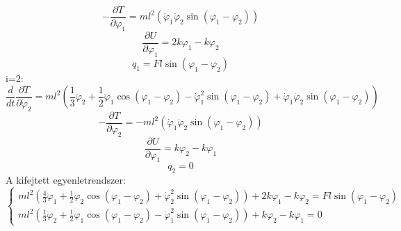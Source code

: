 \documentclass[12pt,twoside]{article}
\begin{document}
\begin{equation} \label{eq:Newton}
-\frac{\partial T}{\partial \varphi_1}=ml^2\left(\dot\varphi_1\dot\varphi_2\sin{(\varphi_1-\varphi_2)}\right)
\end{equation}
\begin{equation} \label{eq:Newton}
\frac{\partial U}{\partial \varphi_1}=2k\varphi_1-k\varphi_2
\end{equation}
\begin{equation} \label{eq:Newton}
q_1 =Fl \sin{(\varphi_1-\varphi_2)}
\end{equation}
i=2:
\begin{equation} \label{eq:Newton}
\frac{d}{dt}\frac{\partial T}{\partial \dot \varphi_2}=
ml^2\left(\frac{1}{3} \ddot \varphi_2+\frac{1}{2}\ddot \varphi_1 \cos{(\varphi_1-\varphi_2)}-\dot\varphi_1^2\sin{(\varphi_1-\varphi_2)}+\dot\varphi_1\dot\varphi_2\sin{(\varphi_1-\varphi_2)}\right)
\end{equation}
\begin{equation} \label{eq:Newton}
-\frac{\partial T}{\partial \varphi_2}=-ml^2\left(\dot\varphi_1\dot\varphi_2\sin{(\varphi_1-\varphi_2)}\right)
\end{equation}
\begin{equation} \label{eq:Newton}
\frac{\partial U}{\partial \varphi_1}=k\varphi_2-k\varphi_1
\end{equation}
\begin{equation} \label{eq:Newton}
q_2 =0
\end{equation}
A kifejtett egyenletrendszer:
\begin{equation} \label{eq:Newton}
\begin{cases}
ml^2\left(\frac{4}{3} \ddot \varphi_1+\frac{1}{2}\ddot \varphi_2 \cos{(\varphi_1-\varphi_2)}+\dot\varphi_2^2\sin{(\varphi_1-\varphi_2)}\right)+2k\varphi_1-k\varphi_2=Fl \sin{(\varphi_1-\varphi_2)}
\\ 
ml^2\left(\frac{1}{3} \ddot \varphi_2+\frac{1}{2}\ddot \varphi_1 \cos{(\varphi_1-\varphi_2)}-\dot\varphi_1^2\sin{(\varphi_1-\varphi_2)}\right)+k\varphi_2-k\varphi_1=0
\end{cases}
\end{equation}
\end{document}
